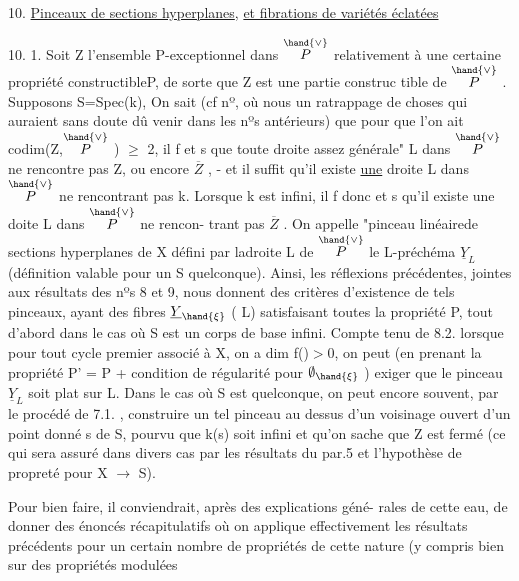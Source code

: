 
10. \uline{Pinceaux de sections hyperplanes}, \uline{et fibrations de variétés éclatées}

10. 1. Soit Z l'ensemble P-exceptionnel dans $\overset{\hand{\vee}}{P}$ relativement à une
certaine propriété constructibleP, de sorte que Z est une partie construc%
tible de $\overset{\hand{\vee}}{P}$ . \hand{(}Supposons S=Spec(k),\hand{)} On sait (cf nº, où nous  un ratrappage
de choses qui auraient sans doute dû venir dans les nºs antérieurs) que pour que
l'on ait codim(Z,$\overset{\hand{\vee}}{P}$ ) $\geqslant$ 2, il f et s que toute droite assez
générale" L dans $\overset{\hand{\vee}}{P}$ ne rencontre pas Z,  ou encore $\overline{Z}$ , - et il suffit
qu'il existe \uline{une} droite L dans $\overset{\hand{\vee}}{P}$ ne rencontrant pas k. Lorsque 
k est infini, il f donc et s qu'il existe une doite L dans $\overset{\hand{\vee}}{P}$ ne rencon-%
trant pas $\overline{Z}$ . On appelle "pinceau linéaire\hand{(}de sections hyperplanes de X\hand{)} défini par ladroite
L de $\overset{\hand{\vee}}{P}$\hand{,} le L-préchéma $\underline{Y}_L$ (définition valable pour un S quelconque).
Ainsi, les réflexions précédentes, jointes aux résultats des nºs 8 et 9,
nous donnent des critères d'existence de tels pinceaux, ayant des fibres
$\underline{Y}_{\hand{\xi}}$ ( \hand{$\xi \in$}L) satisfaisant toutes la propriété P, tout d'abord dans le
cas  \hand{(}où S est un\hand{)} corps de base infini.  Compte tenu de
8.2.\hand{,} lorsque  pour tout cycle premier associé à X, on a dim f()$>$0,
on peut (en prenant la propriété P' = P + condition de régularité
pour $\emptyset_{\hand{\xi}}$ ) exiger que le pinceau $\underline{Y}_L$ soit plat sur L. Dans le cas
où S est quelconque, on peut encore souvent, par le procédé de 7.1. ,
construire un tel pinceau au dessus d'un voisinage ouvert d'un point
donné s de S, pourvu que k(s) soit infini et qu'on sache que Z est fermé
(ce qui sera assuré dans divers cas par les résultats du par.5 et
l'hypothèse de propreté pour X $\rightarrow$ S).

\placedmargin{|} Pour bien faire, il conviendrait, après des explications géné-%
rales de cette eau, de donner des énoncés récapitulatifs où on
applique effectivement les résultats précédents pour un certain nombre
de propriétés de cette nature (y compris bien sur des propriétés modulées\hand{)}

